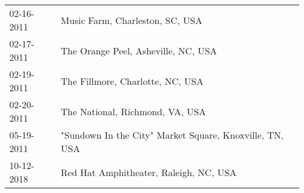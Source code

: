 \begin{supertabular}{ll}
 02-16-2011 &                          Music Farm, Charleston, SC, USA \\
 02-17-2011 &                      The Orange Peel, Asheville, NC, USA \\
 02-19-2011 &                         The Fillmore, Charlotte, NC, USA \\
 02-20-2011 &                          The National, Richmond, VA, USA \\
 05-19-2011 &  "Sundown In the City" Market Square, Knoxville, TN, USA \\
 10-12-2018 &                   Red Hat Amphitheater, Raleigh, NC, USA \\
\end{supertabular}
